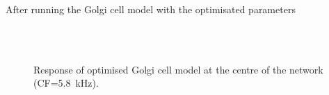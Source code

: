 


After running the Golgi cell model with the optimisated parameters 
\begin{figure}[h]
\centering
{}\\
\\
 \label{fig:Golgi_verification}
 \caption{Response of optimised Golgi cell model at the centre of the network (CF=5.8~kHz).}
\end{figure}


